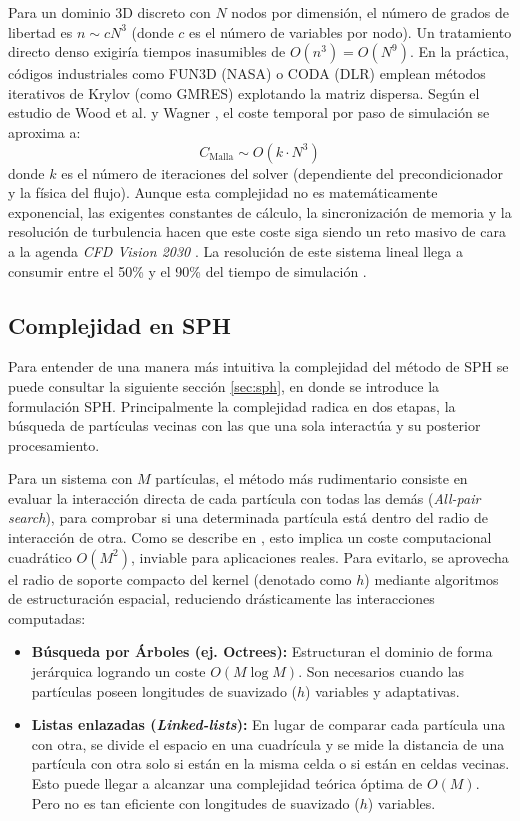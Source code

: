 Para un dominio 3D discreto con $N$ nodos por dimensión, el número de grados de libertad es $n \sim cN^3$ (donde $c$ es el número de variables por nodo). Un tratamiento directo denso exigiría tiempos inasumibles de $O(n^3) = O(N^9)$. En la práctica, códigos industriales como FUN3D (NASA) o CODA (DLR) emplean métodos iterativos de Krylov (como GMRES) explotando la matriz dispersa. Según el estudio de Wood et al. \cite{Wood2020SLAT} y Wagner \cite{Wagner2021CODASpliss}, el coste temporal por paso de simulación se aproxima a:
\[
C_{\text{Malla}} \sim O(k \cdot N^3)
\]
donde $k$ es el número de iteraciones del solver (dependiente del precondicionador y la física del flujo). Aunque esta complejidad no es matemáticamente exponencial, las exigentes constantes de cálculo, la sincronización de memoria y la resolución de turbulencia hacen que este coste siga siendo un reto masivo de cara a la agenda \textit{CFD Vision 2030} \cite{Slotnick2014CFDV2030}. La resolución de este sistema lineal llega a consumir entre el 50\% y el 90\% del tiempo de simulación \cite{Wood2020SLAT}.


\subsection{Complejidad en SPH}

Para entender de una manera más intuitiva la complejidad del método de SPH se puede consultar la siguiente sección \ref{sec:sph}, en donde se introduce la formulación SPH. Principalmente la complejidad radica en dos etapas, la búsqueda de partículas vecinas con las que una sola interactúa y su posterior procesamiento.

Para un sistema con $M$ partículas, el método más rudimentario consiste en evaluar la interacción directa de cada partícula con todas las demás (\textit{All-pair search}), para comprobar si una determinada partícula está dentro del radio de interacción de otra. Como se describe en \cite{liu2003sph}, esto implica un coste computacional cuadrático $O(M^2)$, inviable para aplicaciones reales. Para evitarlo, se aprovecha el radio de soporte compacto del kernel (denotado como $h$) mediante algoritmos de estructuración espacial, reduciendo drásticamente las interacciones computadas:

\begin{itemize}
    \item \textbf{Búsqueda por Árboles (ej. Octrees):} Estructuran el dominio de forma jerárquica logrando un coste $O(M \log M)$. Son necesarios cuando las partículas poseen longitudes de suavizado ($h$) variables y adaptativas.
    \item \textbf{Listas enlazadas (\textit{Linked-lists}):} En lugar de comparar cada partícula una con otra, se divide el espacio en una cuadrícula y se mide la distancia de una partícula con otra solo si están en la misma celda o si están en celdas vecinas. Esto puede llegar a alcanzar una complejidad teórica óptima de $O(M)$. Pero no es tan eficiente con longitudes de suavizado ($h$) variables.
\end{itemize}

